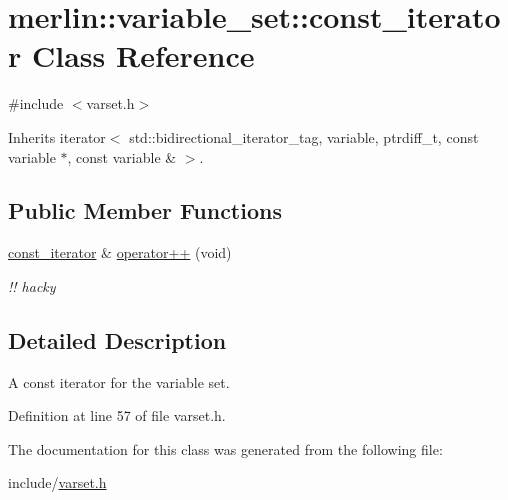\hypertarget{classmerlin_1_1variable__set_1_1const__iterator}{}\section{merlin\+:\+:variable\+\_\+set\+:\+:const\+\_\+iterator Class Reference}
\label{classmerlin_1_1variable__set_1_1const__iterator}


{\ttfamily \#include $<$varset.\+h$>$}



Inherits iterator$<$ std\+::bidirectional\+\_\+iterator\+\_\+tag, variable, ptrdiff\+\_\+t, const variable $\ast$, const variable \& $>$.

\subsection*{Public Member Functions}
\begin{DoxyCompactItemize}
\item 
\hypertarget{classmerlin_1_1variable__set_1_1const__iterator_abcb1fb8ed01562696aba64ebf2cc0e68}{}\hyperlink{classmerlin_1_1variable__set_1_1const__iterator}{const\+\_\+iterator} \& \hyperlink{classmerlin_1_1variable__set_1_1const__iterator_abcb1fb8ed01562696aba64ebf2cc0e68}{operator++} (void)\label{classmerlin_1_1variable__set_1_1const__iterator_abcb1fb8ed01562696aba64ebf2cc0e68}

\begin{DoxyCompactList}\small\item\em !! hacky \end{DoxyCompactList}\end{DoxyCompactItemize}


\subsection{Detailed Description}
A const iterator for the variable set. 

Definition at line 57 of file varset.\+h.



The documentation for this class was generated from the following file\+:\begin{DoxyCompactItemize}
\item 
include/\hyperlink{varset_8h}{varset.\+h}\end{DoxyCompactItemize}

